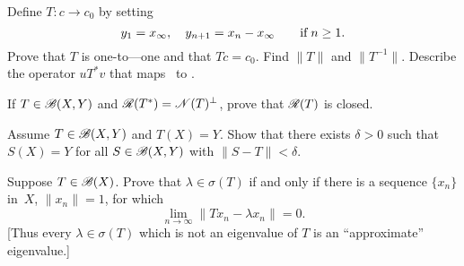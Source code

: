 \begin{enumerate}
\begin{excopy}
\begin{itemize}
Define \(T: c \to c_0\) by setting
\begin{equation*}
 y_1 = x_\infty,\quad y_{n+1} = x_n - x_\infty \qquad \textnormal{if}\; n \geq 1.
\end{equation*}
Prove that $T$ is one-to—one and that \(Tc = c_0\).
 Find \(\|T\|\) and \(\|T^{-1}\|\). Describe the
operator \(uT^*v\) that maps \ellone\ to \ellone.
\end{itemize}
\end{excopy}

\begin{itemize}




\end{itemize}


\unfinished

\begin{excopy}
If \(T \in \mathscr{B}(X,Y)\) and \(\mathscr{R}(T^*) = \mathscr{N}(T)^\perp\),
prove that \(\mathscr{R}(T)\) is closed.
\end{excopy}

\unfinished

\begin{excopy}
Assume \(T \in \mathscr{B}(X,Y)\) and \(T(X)=Y\). Show that there exists \(\delta>0\)
such that \(S(X)=Y\) for all \(S\in\mathscr{B}(X,Y)\) with \(\|S-T\|<\delta\).
\end{excopy}

\begin{excopy}
Suppose \(T \in \mathscr{B}(X)\). Prove that \(\lambda \in \sigma(T)\) if and only if
there is a sequence \(\{x_n\}\) in~$X$, \(\|x_n\|=1\), for which 
\begin{equation*}
\lim_{n\to\infty} \|T x_n - \lambda x_n\| = 0.
\end{equation*}
[Thus every \(\lambda \in \sigma(T)\) which is not an eigenvalue of $T$
is an ``approximate'' eigenvalue.]
\end{excopy}

\unfinished

\end{enumerate}



